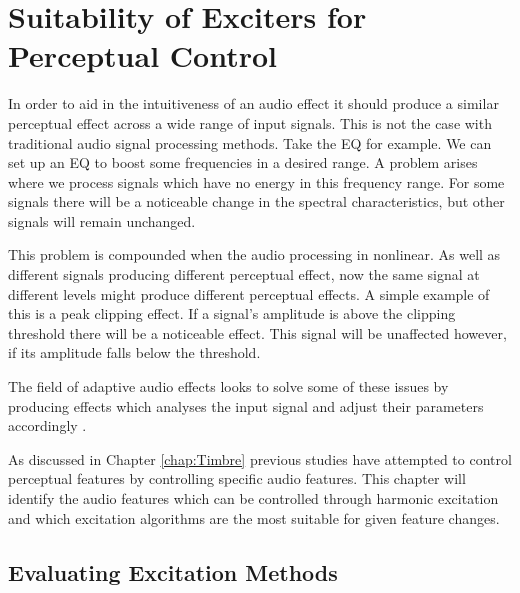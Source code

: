 
\chapter{Suitability of Exciters for Perceptual Control}
\label{chap:FeatureControl}

	In order to aid in the intuitiveness of an audio effect it should produce a similar perceptual effect across a wide 
	range of input signals. This is not the case with traditional audio signal processing methods. Take the EQ for 
	example. We can set up an EQ to boost some frequencies in a desired range. A problem arises where we process 
	signals which have no energy in this frequency range. For some signals there will be a noticeable change in the 
	spectral characteristics, but other signals will remain unchanged.

	This problem is compounded when the audio processing in nonlinear. As well as different signals producing different 
	perceptual effect, now the same signal at different levels might produce different perceptual effects. A simple 
	example of this is a peak clipping effect. If a signal's amplitude is above the clipping threshold there will be a 
	noticeable effect. This signal will be unaffected however, if its amplitude falls below the threshold.


	The field of adaptive audio effects looks to solve some of these issues by producing effects which analyses the 
	input signal and adjust their parameters accordingly .

	As discussed in Chapter \ref{chap:Timbre} previous studies have attempted to control perceptual features by 
	controlling specific audio features. This chapter will identify the audio features which can be controlled through 
	harmonic excitation and which excitation algorithms are the most suitable for given feature changes.

\section{Evaluating Excitation Methods}
\label{sec:FeatureControl-MethodEvaluation}

